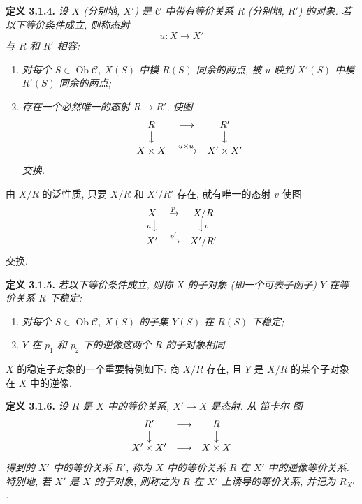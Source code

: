 \medskip
\noindent{}\textbf{定义 3.1.4.}
\textit{设 \(X\) (分别地, \(X'\)) 是 \(\mathscr C\) 中带有等价关系
\(R\) (分别地, \(R'\)) 的对象. 若以下等价条件成立,
则称态射
\[
  u:X\longrightarrow X'
\]
\emph{与 \(R\) 和 \(R'\) 相容}:}
\begin{enumerate}
  \item[(i)]
  \textit{对每个 \(S\in\operatorname{Ob}\mathscr C\),
  \(X(S)\) 中模 \(R(S)\) 同余的两点, 被 \(u\) 映到
  \(X'(S)\) 中模 \(R'(S)\) 同余的两点;}
  \item[(ii)]
  \textit{存在一个必然唯一的态射 \(R\to R'\), 使图}
  \[
    \begin{array}{ccc}
      R & \longrightarrow & R'\\
      \big\downarrow && \big\downarrow\\
      X\times X & \xrightarrow{u\times u} & X'\times X'
    \end{array}
  \]
  \textit{交换.}
\end{enumerate}

由 \(X/R\) 的泛性质, 只要 \(X/R\) 和 \(X'/R'\) 存在,
就有唯一的态射 \(v\) 使图
\[
  \begin{array}{ccc}
    X & \xrightarrow{p} & X/R\\
    {\scriptstyle u}\big\downarrow && \big\downarrow{\scriptstyle v}\\
    X' & \xrightarrow{p'} & X'/R'
  \end{array}
\]
交换.

\medskip
\noindent{}\textbf{定义 3.1.5.}
\textit{若以下等价条件成立, 则称 \(X\) 的子对象
(即一个可表子函子) \(Y\) \emph{在等价关系 \(R\) 下稳定}:}
\begin{enumerate}
  \item[(i)]
  \textit{对每个 \(S\in\operatorname{Ob}\mathscr C\),
  \(X(S)\) 的子集 \(Y(S)\) 在 \(R(S)\) 下稳定;}
  \item[(ii)]
  \textit{\(Y\) 在 \(p_1\) 和 \(p_2\) 下的逆像这两个
  \(R\) 的子对象相同.}
\end{enumerate}

\(X\) 的稳定子对象的一个重要特例如下: 商 \(X/R\) 存在,
且 \(Y\) 是 \(X/R\) 的某个子对象在 \(X\) 中的逆像.

\medskip
\noindent{}\textbf{定义 3.1.6.}
\textit{设 \(R\) 是 \(X\) 中的等价关系, \(X'\to X\) 是态射.
从 笛卡尔 图
\[
  \begin{array}{ccc}
    R' & \longrightarrow & R\\
    \big\downarrow && \big\downarrow\\
    X'\times X' & \longrightarrow & X\times X
  \end{array}
\]
得到的 \(X'\) 中的等价关系 \(R'\), 称为 \(X\) 中的等价关系
\(R\) 在 \(X'\) 中的\emph{逆像}等价关系.
特别地, 若 \(X'\) 是 \(X\) 的子对象, 则称之为 \(R\) 在
\(X'\) 上\emph{诱导}的等价关系, 并记为 \(R_{X'}\).}

